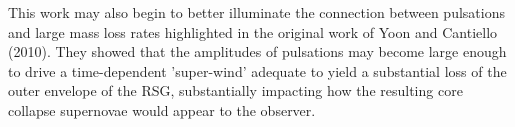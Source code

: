  This work may also begin to better illuminate the connection between
 pulsations and large mass loss rates highlighted in the original work \citet{Yoon_2010}
 of Yoon and Cantiello (2010). They showed that the amplitudes of
 pulsations may become large enough to drive a time-dependent
 'super-wind' adequate to yield a substantial loss of the outer
 envelope of the RSG, substantially impacting how the resulting core
 collapse supernovae would appear to the observer. 